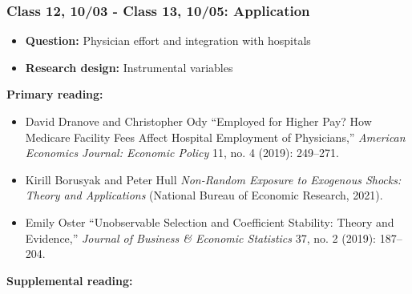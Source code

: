 \documentclass[11pt,]{article}
\providecommand{\tightlist}{%
  \setlength{\itemsep}{0pt}\setlength{\parskip}{0pt}}
\begin{document}
\hypertarget{class-12-1003---class-13-1005-application}{%
\subsubsection{Class 12, 10/03 - Class 13, 10/05:
Application}\label{class-12-1003---class-13-1005-application}}

\begin{itemize}
\tightlist
\item
  \textbf{Question:} Physician effort and integration with hospitals
\item
  \textbf{Research design:} Instrumental variables
\end{itemize}

\textbf{Primary reading:}

\begin{itemize}
\tightlist
\item
  David Dranove and Christopher Ody {``Employed for Higher Pay? {How}
  {Medicare} Facility Fees Affect Hospital Employment of Physicians,''}
  \emph{American Economics Journal: Economic Policy} 11, no. 4 (2019):
  249--271.
\item
  Kirill Borusyak and Peter Hull \emph{Non-Random Exposure to Exogenous
  Shocks: {Theory} and Applications} (National Bureau of Economic
  Research, 2021).
\item
  Emily Oster {``Unobservable {Selection} and {Coefficient} {Stability}:
  {Theory} and {Evidence},''} \emph{Journal of Business \& Economic
  Statistics} 37, no. 2 (2019): 187--204.
\end{itemize}

\textbf{Supplemental reading:}
\end{document}

